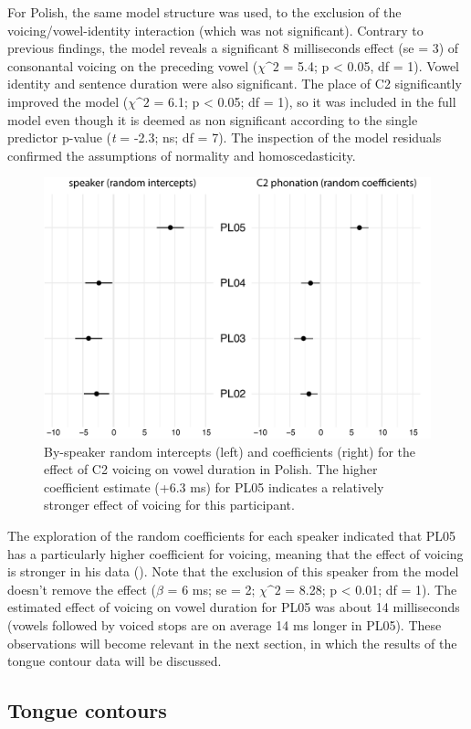 \documentclass[authoryear, twocolumn]{elsarticle}
\begin{document}
For Polish, the same model structure was used, to the exclusion of the
voicing/vowel-identity interaction (which was not significant). Contrary
to previous findings, the model reveals a significant 8 milliseconds
effect (se = 3) of consonantal voicing on the preceding vowel
(\(\chi\^2\) = 5.4; p \textless{} 0.05, df = 1). Vowel identity and
sentence duration were also significant. The place of C2 significantly
improved the model (\(\chi\^2\) = 6.1; p \textless{} 0.05; df = 1), so
it was included in the full model even though it is deemed as non
significant according to the single predictor p-value (\emph{t} = -2.3;
ns; df = 7). The inspection of the model residuals confirmed the
assumptions of normality and homoscedasticity.

\begin{figure}
    \centering
    \includegraphics[height=.3\textwidth]{fig/polish-re.pdf}
    \caption{By-speaker random intercepts (left) and coefficients (right) for the effect of C2 voicing on vowel duration in Polish. The higher coefficient estimate (+6.3 ms) for PL05 indicates a relatively stronger effect of voicing for this participant.}
    \label{f:polish-re}
\end{figure}

The exploration of the random coefficients for each speaker indicated
that PL05 has a particularly higher coefficient for voicing, meaning
that the effect of voicing is stronger in his data ().
Note that the exclusion of this speaker from the model doesn't remove
the effect (\(\beta\) = 6 ms; se = 2; \(\chi\^2\) = 8.28; p \textless{}
0.01; df = 1). The estimated effect of voicing on vowel duration for
PL05 was about 14 milliseconds (vowels followed by voiced stops are on
average 14 ms longer in PL05). These observations will become relevant
in the next section, in which the results of the tongue contour data
will be discussed.

\subsection{Tongue contours}\label{tongue-contours}
\end{document}
